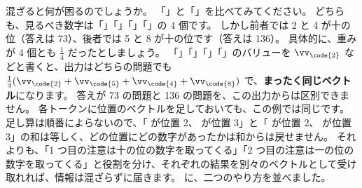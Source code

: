 混ざると何が困るのでしょうか。
「」と「」を比べてみてください。
どちらも、見るべき数字は「」「」「」「」の 4 個です。
しかし前者では 2 と 4 が十の位（答えは 73）、後者では 5 と 8 が十の位です（答えは 136）。
具体的に、重みが 4 個とも $\frac14$ だったとしましょう。
「」「」「」「」のバリューを $\vv_{\code{2}}$ などと書くと、出力はどちらの問題でも $\frac14(\vv_{\code{2}}+\vv_{\code{5}}+\vv_{\code{4}}+\vv_{\code{8}})$ で、\textbf{まったく同じベクトル}になります。
答えが 73 の問題と 136 の問題を、この出力からは区別できません。
各トークンに位置のベクトルを足しておいても、この例では同じです。
足し算は順番によらないので、「 が位置 2、 が位置 3」と「 が位置 2、 が位置 3」の和は等しく、どの位置にどの数字があったかは和からは戻せません。
それよりも、「1 つ目の注意は十の位の数字を取ってくる」「2 つ目の注意は一の位の数字を取ってくる」と役割を分け、それぞれの結果を別々のベクトルとして受け取れれば、情報は混ざらずに届きます。
に、二つのやり方を並べました。


